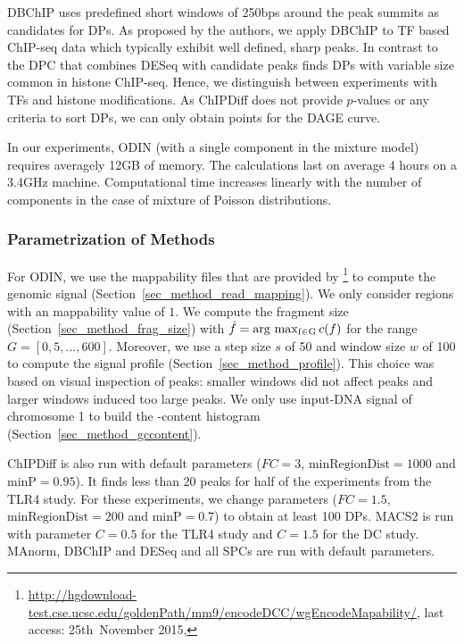 DBChIP uses predefined short windows of 250bps around the peak summits as candidates for DPs.
As proposed by the authors, we apply DBChIP to TF based ChIP-seq data which typically exhibit well defined, sharp peaks.
In contrast to the DPC that combines DESeq with candidate peaks finds DPs with variable size common in histone ChIP-seq.
Hence, we distinguish between experiments with TFs and histone modifications. 
As ChIPDiff does not provide $p$-values or any criteria to sort DPs, we can only obtain points for the DAGE curve. 

In our experiments, ODIN (with a single component in the mixture model) requires averagely 12GB of memory.
The calculations last on average 4 hours on a 3.4GHz machine. 
Computational time increases linearly with the number of components in the case of mixture of Poisson distributions.


\subsubsection{Parametrization of Methods}
For ODIN, we use the mappability files that are provided by \cite{landt2012}\footnote{\url{http://hgdownload-test.cse.ucsc.edu/goldenPath/mm9/encodeDCC/wgEncodeMapability/}, last access: 25th\ No\-vember 2015, } to compute the genomic signal (Section~\ref{sec_method_read_mapping}).
We only consider regions with an mappability value of $1$.  
We compute the fragment size (Section~\ref{sec_method_frag_size}) with $\hat{f}=\operatorname{\operatorname{arg}\,\operatorname{max}_{f \in G}} c(f)$ for the range $G=[0,5, \ldots, 600]$.
Moreover, we use a step size $s$ of 50 and window size $w$ of 100 to compute the signal profile (Section~\ref{sec_method_profile}). 
This choice was based on visual inspection of peaks: smaller windows did not affect peaks and larger windows induced too large peaks. We only use input-DNA signal of chromosome 1 to build the -content histogram (Section~\ref{sec_method_gccontent}). 

ChIPDiff is also run with default parameters ($FC = 3$, $\text{minRegionDist} = 1000$ and $\text{minP} = 0.95$). 
It finds less than 20 peaks for half of the experiments from the TLR4 study. 
For these experiments, we change parameters ($FC = 1.5$, $\text{minRegionDist} = 200$ and $\text{minP} = 0.7$) to obtain at least 100 DPs.
MACS2 is run with parameter $C=0.5$ for the TLR4 study and $C=1.5$ for the DC study. 
MAnorm, DBChIP and DESeq and all SPCs are run with default parameters.

